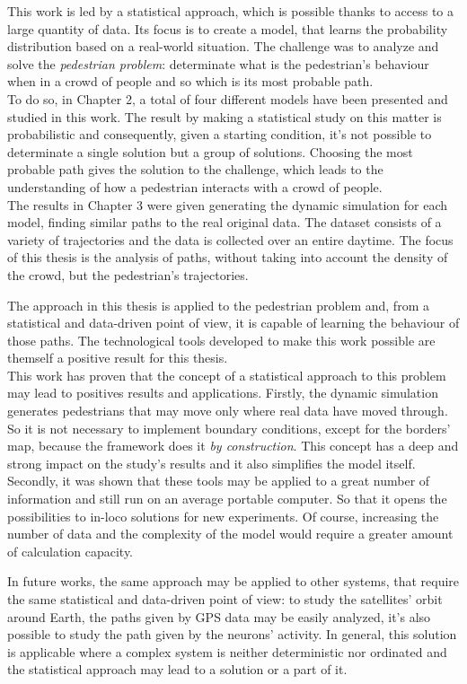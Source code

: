 \documentclass[class=article, crop=false]{standalone}
\begin{document}

This work is led by a statistical approach, which is possible thanks to access to a large quantity of data.
Its focus is to create a model, that learns the probability distribution based on a real-world situation.
The challenge was to analyze and solve the \emph{pedestrian problem}: determinate what is the pedestrian's behaviour when in a crowd of people and so which is its most probable path.
\\To do so, in Chapter 2, a total of four different models have been presented and studied in this work.
The result by making a statistical study on this matter is probabilistic and consequently, given a starting condition, it's not possible to determinate a single solution but a group of solutions.
Choosing the most probable path gives the solution to the challenge, which leads to the understanding of how a pedestrian interacts with a crowd of people.
\\The results in Chapter 3 were given generating the dynamic simulation for each model, finding similar paths to the real original data.
The dataset consists of a variety of trajectories and the data is collected over an entire daytime.
The focus of this thesis is the analysis of paths, without taking into account the density of the crowd, but the pedestrian's trajectories.

The approach in this thesis is applied to the pedestrian problem and, from a statistical and data-driven point of view, it is capable of learning the behaviour of those paths.
The technological tools developed to make this work possible are themself a positive result for this thesis.
\\This work has proven that the concept of a statistical approach to this problem may lead to positives results and applications.
Firstly, the dynamic simulation generates pedestrians that may move only where real data have moved through.
So it is not necessary to implement boundary conditions, except for the borders' map, because the framework does it \emph{by construction}.
This concept has a deep and strong impact on the study's results and it also simplifies the model itself.
Secondly, it was shown that these tools may be applied to a great number of information and still run on an average portable computer.
So that it opens the possibilities to in-loco solutions for new experiments.
Of course, increasing the number of data and the complexity of the model would require a greater amount of calculation capacity.

In future works, the same approach may be applied to other systems, that require the same statistical and data-driven point of view: 
to study the satellites' orbit around Earth, the paths given by GPS data may be easily analyzed, it's also possible to study the path given by the neurons' activity.
In general, this solution is applicable where a complex system is neither deterministic nor ordinated and the statistical approach may lead to a solution or a part of it.
\end{document}
